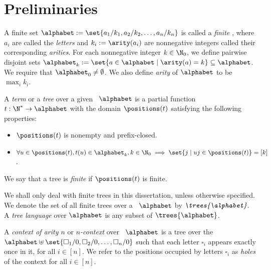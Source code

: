 \section{Preliminaries}\label{sec:preliminaries_atomicTreeTransforms}

\begin{definition}\label{def:rankedAlphabet}
    A finite set $\alphabet := \set{a_1/k_1, a_2/k_2, \dots, a_n/k_n}$ is called a \emph{finite \rab}, where $a_i$ are called the \emph{letters} and $k_i := \arity(a_i)$ are nonnegative integers called their corresponding \emph{arities}. For each nonnegative integer $k \in \N_0$, we define pairwise disjoint sets $\alphabet_k := \set{a \in \alphabet \mid \arity(a) = k} \subseteq \alphabet$. We require that $\alphabet_0 \neq \emptyset$. We also define \emph{arity} of $\alphabet$ to be $\max_i k_i$.
\end{definition}


\begin{definition}\label{def:tree}
    A \emph{term} or a \emph{tree} over a given \rab\ $\alphabet$ is a partial function $t : \N^* \to \alphabet$ with the domain $\positions(t)$ satisfying the following properties:
    \begin{itemize}
        \item $\positions(t)$ is nonempty and prefix-closed.
        \item $\forall u \in \positions(t), t(u) \in \alphabet_k, k \in \N_0 \implies \set{j \mid uj \in \positions(t)} = [k]$. 
    \end{itemize}
    We say that a tree is \emph{finite} if $\positions(t)$ is finite.
\end{definition}

We shall only deal with finite trees in this dissertation, unless otherwise specified. We denote the set of all finite trees over a \rab\ $\alphabet$ by $\emph{\trees{\alphabet}}$. A \emph{tree language} over $\alphabet$ is any subset of $\trees{\alphabet}$.

\begin{definition}[Context]\label{def:context}
    A \emph{context of arity $n$} or \emph{$n$-context} over \rab\ $\alphabet$ is a tree over the \rab\ $\alphabet \uplus \set{\square_1/0, \square_2/0, \dots, \square_n/0}$ such that each letter $\square_i$ appears exactly once in it, for all $i \in [n]$. We refer to the positions occupied by letters $\square_i$ as \emph{holes} of the context for all $i \in [n]$.
\end{definition}

